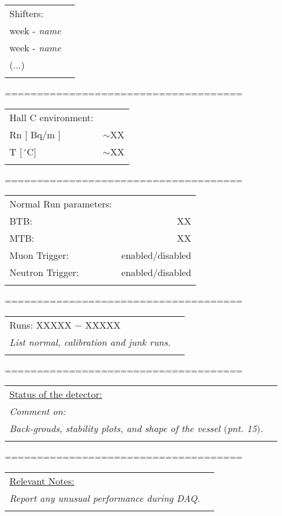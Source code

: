 \documentclass[a4paper,10pt]{article}
\begin{document}
\begin{tabular}{lr}
Shifters: &\\
week - \textit{name}  & \\
week - \textit{name} & \\
(...) & \\ \\
\end{tabular}

=====================================

\begin{tabular}{lr}
Hall C environment:&\\
Rn [ Bq/m ]&$\sim$XX \\
T [$\,^{\circ}\mathrm{C}$]&$\sim$XX  \\ \\
\end{tabular}

=====================================

\begin{tabular}{lr}
Normal Run parameters: &\\
BTB:&XX \\
MTB:&XX \\
Muon Trigger:&enabled/disabled \\
Neutron Trigger:&enabled/disabled \\ \\
\end{tabular}

=====================================

\begin{tabular}{lr}
Runs: XXXXX $-$ XXXXX  & \\*
\textit{List normal, calibration and junk runs.} &\\ \\
\end{tabular}

=====================================

\begin{tabular}{lr}
\underline{Status of the detector:} &\\*
\textit{Comment on:} &\\*
\textit{Back-grouds, stability plots, and shape of the vessel $($pnt. 15$)$.} &\\ \\
\end{tabular}

=====================================

\begin{tabular}{lr}
\underline{Relevant Notes:} &\\*
\textit{Report any unusual performance during DAQ.} &\\ \\
\end{tabular}
\end{document}
